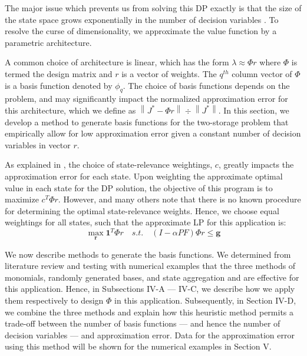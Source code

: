 \documentclass[conference]{IEEEtran}
\newcommand{\norm}[1]{\left\lVert#1\right\rVert}
\begin{document}
The major issue which prevents us from solving this DP exactly is that the size of the state space grows exponentially in the number of decision variables \cite{deFarias:2003:LPA:970869.970918}. To resolve the curse of dimensionality, we approximate the value function by a parametric architecture. %

A common choice of architecture is linear, which has the form $\lambda\approx \Phi r$ where $\Phi$ is termed the design matrix and $r$ is a vector of weights. The $q^{th}$ column vector of $\Phi$ is a basis function denoted by $\phi_{q}$. The choice of basis functions depends on the problem, and may significantly impact the normalized approximation error for this architecture, which we define as $\norm{J^{*}-\Phi r}\div\norm{J^{*}}$. In this section, we develop a method to generate basis functions for the two-storage problem that empirically allow for low approximation error given a constant number of decision variables in vector $r$.

As explained in \cite{deFarias:2003:LPA:970869.970918}, the choice of state-relevance weightings, $c$, greatly impacts the approximation error for each state. Upon weighting the approximate optimal value in each state for the DP solution, the objective of this program is to maximize $c^{T}\Phi r$. However, \cite{deFarias:2003:LPA:970869.970918,PatrascuReluEugen2004} and many others note that there is no known procedure for determining the optimal state-relevance weights. Hence, we choose equal weightings for all states, such that the approximate LP for this application is:
\begin{equation} \label{eq:ApproxLP}
    \max_{\boldsymbol{r}} \boldsymbol{1}^{T} \Phi r
    \hspace{1em}s.t.\hspace{1em}
    (I-\alpha PF)\Phi r \leq \boldsymbol{g}
\end{equation}

We now describe methods to generate the basis functions. We determined from literature review and testing with numerical examples that the three methods of monomials, randomly generated bases, and state aggregation and are effective for this application. Hence, in Subsections IV-A --- IV-C, we describe how we apply them respectively to design $\Phi$ in this application. Subsequently, in Section IV-D, we combine the three methods and explain how this heuristic method permits a trade-off between the number of basis functions --- and hence the number of decision variables --- and approximation error. Data for the approximation error using this method will be shown for the numerical examples in Section V.
\end{document}
